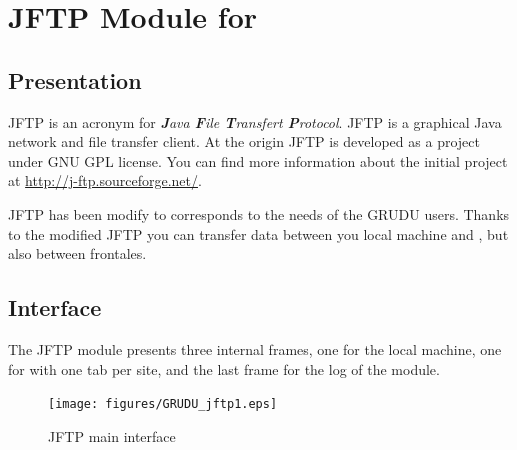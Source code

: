 \chapter{JFTP Module for \grudu}
\section{Presentation}
JFTP is an acronym for \textit{\textbf{J}ava \textbf{F}ile \textbf{T}ransfert
\textbf{P}rotocol}. JFTP is a graphical Java network and file transfer client.
At the origin JFTP is developed as a project under GNU GPL license. You can find
more information about the initial project at
\url{http://j-ftp.sourceforge.net/}. 

JFTP has been modify to corresponds to the needs of the GRUDU users. Thanks to
the modified JFTP you can transfer data between you local machine and \gfk, but
also between \gfk frontales.

\section{Interface}

The JFTP module presents three internal frames, one for the local machine, one
for \gfk with one tab per site, and the last frame for the log of the module.

\begin{figure}[H]
	\centering
	\texttt{[image: figures/GRUDU\_jftp1.eps]}
	\caption{JFTP main interface}
	\label{fig:GRUDU_jftp1}
\end{figure}


